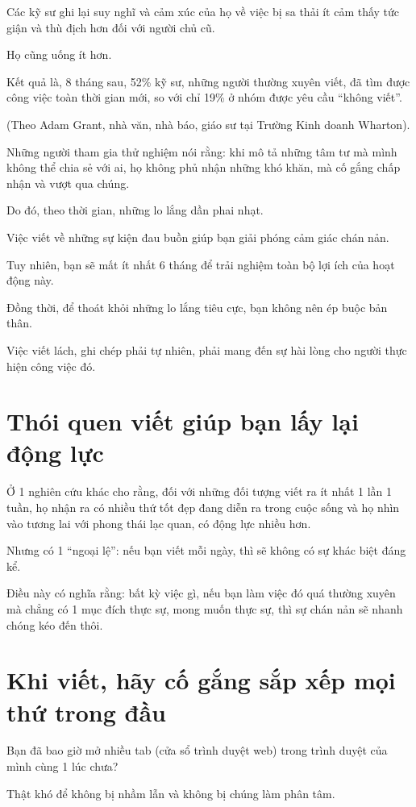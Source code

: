 \documentclass{book}
\numberwithin{equation}{section}
\begin{document}
%
Các kỹ sư ghi lại suy nghĩ và cảm xúc của họ về việc bị sa thải ít cảm thấy tức giận và thù địch hơn đối với người chủ cũ.

Họ cũng uống ít hơn.

Kết quả là, 8 tháng sau, 52\% kỹ sư, những người thường xuyên viết, đã tìm được công việc toàn thời gian mới, so với chỉ 19\% ở nhóm được yêu cầu ``không viết''.

(Theo Adam Grant, nhà văn, nhà báo, giáo sư tại Trường Kinh doanh Wharton).

%
Những người tham gia thử nghiệm nói rằng: khi mô tả những tâm tư mà mình  không thể chia sẻ với ai, họ không phủ nhận những khó khăn, mà cố gắng chấp nhận và vượt qua chúng.

Do đó, theo thời gian, những lo lắng dần phai nhạt.

%
Việc viết về những sự kiện đau buồn giúp bạn giải phóng cảm giác chán nản.

Tuy nhiên, bạn sẽ mất ít nhất 6 tháng để trải nghiệm toàn bộ lợi ích của hoạt động này.

Đồng thời, để thoát khỏi những lo lắng tiêu cực, bạn không nên ép buộc bản thân.

Việc viết lách, ghi chép phải tự nhiên, phải mang đến sự hài lòng cho người thực hiện công việc đó.

\section{Thói quen viết giúp bạn lấy lại động lực}
Ở 1 nghiên cứu khác cho rằng, đối với những đối tượng viết ra ít nhất 1 lần 1 tuần, họ nhận ra có nhiều thứ tốt đẹp đang diễn ra trong cuộc sống và họ nhìn vào tương lai với phong thái lạc quan, có động lực nhiều hơn.

%
Nhưng có 1 ``ngoại lệ'': nếu bạn viết mỗi ngày, thì sẽ không có sự khác biệt đáng kể.

Điều này có nghĩa rằng: bất kỳ việc gì, nếu bạn làm việc đó quá thường xuyên mà chẳng có 1 mục đích thực sự, mong muốn thực sự, thì sự chán nản sẽ nhanh chóng kéo đến thôi.

\section{Khi viết, hãy cố gắng sắp xếp mọi thứ trong đầu}
Bạn đã bao giờ mở nhiều tab (cửa sổ trình duyệt web) trong trình duyệt của mình cùng 1 lúc chưa?

Thật khó để không bị nhầm lẫn và không bị chúng làm phân tâm.
\end{document}
